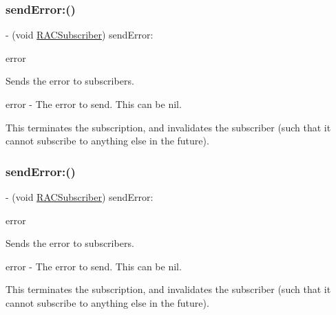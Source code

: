 \subsubsection{\texorpdfstring{send\+Error\+:()}{sendError:()}\hspace{0.1cm}{\footnotesize\ttfamily [2/3]}}
{\footnotesize\ttfamily -\/ (void \mbox{\hyperlink{interface_r_a_c_subscriber}{R\+A\+C\+Subscriber}}) send\+Error\+: \begin{DoxyParamCaption}\item[{(N\+S\+Error $\ast$)}]{error }\end{DoxyParamCaption}\hspace{0.3cm}{\ttfamily [required]}}

Sends the error to subscribers.

error -\/ The error to send. This can be {\ttfamily nil}.

This terminates the subscription, and invalidates the subscriber (such that it cannot subscribe to anything else in the future). \mbox{\label{protocol_r_a_c_subscriber_01-p_a70712a2213c3b1ac2d06b3634e924974}} 
\subsubsection{\texorpdfstring{send\+Error\+:()}{sendError:()}\hspace{0.1cm}{\footnotesize\ttfamily [3/3]}}
{\footnotesize\ttfamily -\/ (void \mbox{\hyperlink{interface_r_a_c_subscriber}{R\+A\+C\+Subscriber}}) send\+Error\+: \begin{DoxyParamCaption}\item[{(N\+S\+Error $\ast$)}]{error }\end{DoxyParamCaption}\hspace{0.3cm}{\ttfamily [required]}}

Sends the error to subscribers.

error -\/ The error to send. This can be {\ttfamily nil}.

This terminates the subscription, and invalidates the subscriber (such that it cannot subscribe to anything else in the future). \mbox{\label{protocol_r_a_c_subscriber_01-p_ac5b675c8be8a83f8e7b7d96301cd6656}} 
